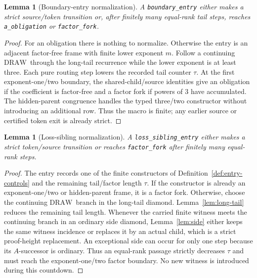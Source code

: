 \documentclass[11pt]{article}
\newtheorem{lemma}[theorem]{Lemma}
\newcommand{\DRAW}{\ensuremath{\mathrm{DRAW}}}
\begin{document}
\begin{lemma}[Boundary-entry normalization]\label{lem:boundary-normalize}
A \texttt{boundary\_entry} either makes a strict source/token transition or,
after finitely many equal-rank tail steps, reaches
\texttt{a\_obligation} or \texttt{factor\_fork}.
\end{lemma}

\begin{proof}
For an obligation there is nothing to normalize. Otherwise the entry is an
adjacent factor-free frame with finite lower exponent $m$. Follow a continuing
\DRAW\ through the long-tail recurrence while the lower exponent is at least
three. Each pure routing step lowers the recorded tail counter $\tau$. At the
first exponent-one/two boundary, the shared-child/source identities give an
obligation if the coefficient is factor-free and a factor fork if powers of
$3$ have accumulated. The hidden-parent congruence handles the typed
three/two constructor without introducing an additional row. Thus the macro is
finite; any earlier source or certified token exit is already strict.
\end{proof}

\begin{lemma}[Loss-sibling normalization]\label{lem:loss-sibling}
A \texttt{loss\_sibling\_entry} either makes a strict token/source transition
or reaches \texttt{factor\_fork} after finitely many equal-rank steps.
\end{lemma}

\begin{proof}
The entry records one of the finite constructors of
Definition~\ref{def:entry-controls} and the remaining tail/factor length
$\tau$. If the constructor is already an exponent-one/two or hidden-parent
frame, it is a factor fork. Otherwise, choose the continuing \DRAW\ branch in
the long-tail diamond. Lemma~\ref{lem:long-tail} reduces the remaining tail
length. Whenever the carried finite witness meets the continuing branch in an
ordinary side diamond, Lemma~\ref{lem:side} either keeps the same witness
incidence or replaces it by an actual child, which is a strict proof-height
replacement. An exceptional side can occur for only one step because its
$A$-successor is ordinary. Thus an equal-rank passage strictly decreases
$\tau$ and must reach the exponent-one/two factor boundary. No new witness is
introduced during this countdown.
\end{proof}
\end{document}
